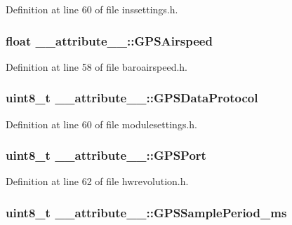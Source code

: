 \-Definition at line 60 of file inssettings.\-h.

\hypertarget{struct____attribute_____a48a824ca0a456909909e5b04287a600f}{
\subsubsection[{\-G\-P\-S\-Airspeed}]{\setlength{\rightskip}{0pt plus 5cm}float {\bf \-\_\-\-\_\-attribute\-\_\-\-\_\-\-::\-G\-P\-S\-Airspeed}}}\label{struct____attribute_____a48a824ca0a456909909e5b04287a600f}


\-Definition at line 58 of file baroairspeed.\-h.

\hypertarget{struct____attribute_____a66b998daa51777f1f455767be9e45ef2}{
\subsubsection[{\-G\-P\-S\-Data\-Protocol}]{\setlength{\rightskip}{0pt plus 5cm}uint8\-\_\-t {\bf \-\_\-\-\_\-attribute\-\_\-\-\_\-\-::\-G\-P\-S\-Data\-Protocol}}}\label{struct____attribute_____a66b998daa51777f1f455767be9e45ef2}


\-Definition at line 60 of file modulesettings.\-h.

\hypertarget{struct____attribute_____a08e5752671d28c93ff42e5560676b210}{
\subsubsection[{\-G\-P\-S\-Port}]{\setlength{\rightskip}{0pt plus 5cm}uint8\-\_\-t {\bf \-\_\-\-\_\-attribute\-\_\-\-\_\-\-::\-G\-P\-S\-Port}}}\label{struct____attribute_____a08e5752671d28c93ff42e5560676b210}


\-Definition at line 62 of file hwrevolution.\-h.

\hypertarget{struct____attribute_____a5d4a820a32e334841e9a01da5fee4ee7}{
\subsubsection[{\-G\-P\-S\-Sample\-Period\-\_\-ms}]{\setlength{\rightskip}{0pt plus 5cm}uint8\-\_\-t {\bf \-\_\-\-\_\-attribute\-\_\-\-\_\-\-::\-G\-P\-S\-Sample\-Period\-\_\-ms}}}\label{struct____attribute_____a5d4a820a32e334841e9a01da5fee4ee7}


